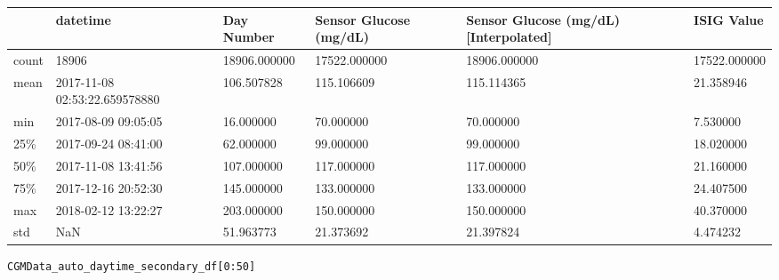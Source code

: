 \bigskip\noindent
\begin{tabular}{p{}p{}p{}p{}p{}p{}}
\toprule
 & datetime & Day Number & Sensor Glucose (mg/dL) & Sensor Glucose (mg/dL) [Interpolated] & ISIG Value \\
\hline
count & 18906 & 18906.000000 & 17522.000000 & 18906.000000 & 17522.000000 \\
\hline
mean & 2017-11-08 02:53:22.659578880 & 106.507828 & 115.106609 & 115.114365 & 21.358946 \\
\hline
min & 2017-08-09 09:05:05 & 16.000000 & 70.000000 & 70.000000 & 7.530000 \\
\hline
25\% & 2017-09-24 08:41:00 & 62.000000 & 99.000000 & 99.000000 & 18.020000 \\
\hline
50\% & 2017-11-08 13:41:56 & 107.000000 & 117.000000 & 117.000000 & 21.160000 \\
\hline
75\% & 2017-12-16 20:52:30 & 145.000000 & 133.000000 & 133.000000 & 24.407500 \\
\hline
max & 2018-02-12 13:22:27 & 203.000000 & 150.000000 & 150.000000 & 40.370000 \\
\hline
std & NaN & 51.963773 & 21.373692 & 21.397824 & 4.474232 \\
\hline
\bottomrule
\end{tabular}

\bigskip

\begin{verbatim}
CGMData_auto_daytime_secondary_df[0:50]
\end{verbatim}


